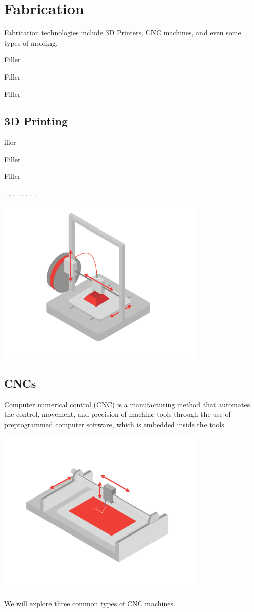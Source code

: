 \chapter{Fabrication}

Fabrication technologies include 3D Printers, CNC machines, and even some types of molding.

Filler


Filler

Filler

\section{3D Printing}
iller


Filler

Filler

.
.
.
.
.
.
.
.
\newpage

\includegraphics[width=0.75\textwidth]{3dprinter.png}


\section{CNCs}

Computer numerical control (CNC) is a manufacturing method that automates the control, movement, and precision of machine tools through the use of preprogrammed computer software, which is embedded inside the tools

\includegraphics[width=0.75\textwidth]{cnc.png}

We will explore three common types of CNC machines.





